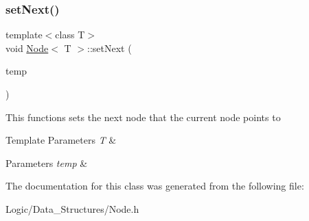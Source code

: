 \subsubsection{\texorpdfstring{setNext()}{setNext()}}
{\footnotesize\ttfamily template$<$class T$>$ \\
void \mbox{\hyperlink{class_node}{Node}}$<$ T $>$\+::set\+Next (\begin{DoxyParamCaption}\item[{\mbox{\hyperlink{class_node}{Node}}$<$ T $>$ $\ast$}]{temp }\end{DoxyParamCaption})}

This functions sets the next node that the current node points to 
\begin{DoxyTemplParams}{Template Parameters}
{\em T} & \\
\hline
\end{DoxyTemplParams}

\begin{DoxyParams}{Parameters}
{\em temp} & \\
\hline
\end{DoxyParams}


The documentation for this class was generated from the following file\+:\begin{DoxyCompactItemize}
\item 
Logic/\+Data\+\_\+\+Structures/Node.\+h\end{DoxyCompactItemize}
